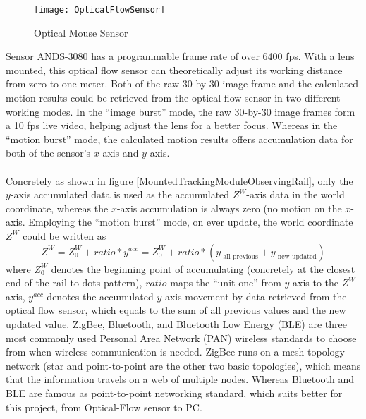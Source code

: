 %
\begin{figure}[h]
\centering
\texttt{[image: OpticalFlowSensor]}
\caption{Optical Mouse Sensor}
\label{OpticalFlowSensor}
\end{figure}%
%
%
Sensor ANDS-3080 has a programmable frame rate of over 6400 fps. With a lens mounted, this optical flow sensor can theoretically adjust its working distance from zero to one meter. Both of the raw 30-by-30 image frame and the calculated motion results could be retrieved from the optical flow sensor in two different working modes. In the \enquote{image burst} mode, the raw 30-by-30 image frames form a 10 fps live video, helping adjust the lens for a better focus. Whereas in the \enquote{motion burst} mode, the calculated motion results offers accumulation data for both of the sensor's \(x\)-axis and \(y\)-axis.
\\\\%
Concretely as shown in figure \ref{MountedTrackingModuleObservingRail}, only the \(y\)-axis accumulated data is used as the accumulated \(Z^W\)-axis data in the world coordinate, whereas the \(x\)-axis accumulation is always zero (no motion on the \(x\)-axis. Employing the \enquote{motion burst} mode, on ever update, the world coordinate \(Z^W\) could be written as%
%
\begin{equation}
%
Z^W = Z^W_0 + ratio*y^{acc} = Z^W_0 + ratio*(y_{\text{\_all\_previous}} + y_{\text{\_new\_updated}})
%
\end{equation}
%
where \(Z^W_0\) denotes the beginning point of accumulating (concretely at the closest end of the rail to dots pattern), \(ratio\) maps the \enquote{unit one} from \(y\)-axis to the \(Z^W\)-axis, \(y^{acc}\) denotes the accumulated \(y\)-axis movement by data retrieved from the optical flow sensor, which equals to the sum of all previous values and the new updated value.
%
%
ZigBee, Bluetooth, and Bluetooth Low Energy (BLE) are three most commonly used Personal Area Network (PAN) wireless standards to choose from when wireless communication is needed. ZigBee runs on a mesh topology network (star and point-to-point are the other two basic topologies), which means that the information travels on a web of multiple nodes. Whereas Bluetooth and BLE are famous as point-to-point networking standard, which suits better for this project, from Optical-Flow sensor to PC.
